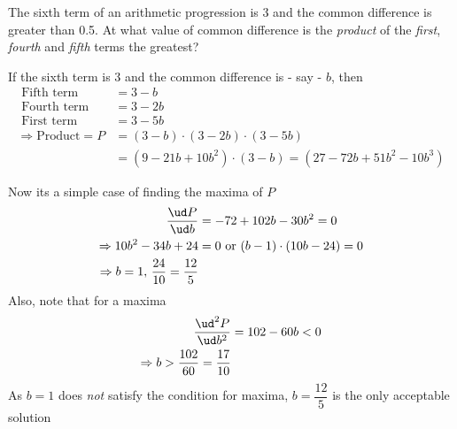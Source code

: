 

\question[4] The sixth term of an arithmetic progression is 3 and the common difference is greater than 0.5. 
At what value of common difference is the \textit{product} of the \textit{first}, \textit{fourth} and \textit{fifth}
terms the greatest?


\ifprintanswers
\fi 

\begin{solution}[\fullpage]
	If the sixth term is 3 and the common difference is - say - $b$, then 
	\begin{align}
		\text{ Fifth term } &= 3-b \\
		\text{ Fourth term } &= 3-2b \\
		\text{ First term } &= 3-5b \\
		\Rightarrow \text{Product} = P &= (3-b)\cdot(3-2b)\cdot(3-5b) \\
		&= (9-21b+10b^2)\cdot(3-b) = (27-72b+51b^2-10b^3)
	\end{align}
	
	Now its a simple case of finding the maxima of $P$
	\begin{align}
		\dfrac{\ud P}{\ud b} &= -72 + 102b - 30b^2 = 0 \\
		\Rightarrow 10b^2 - 34b + 24 &= 0 \text{ or } (b-1)\cdot(10b-24) = 0 \\
		\Rightarrow b = 1,\, \frac{24}{10} = \frac{12}{5}
	\end{align}
	Also, note that for a maxima
	\begin{align}
		\dfrac{\ud^2 P}{\ud b^2} &= 102 - 60b < 0 \\
		\Rightarrow b > \frac{102}{60} = \frac{17}{10}
	\end{align}
	As $b = 1$ does \textit{not} satisfy the condition for maxima, $b = \dfrac{12}{5}$ is 
	the only acceptable solution
\end{solution}
